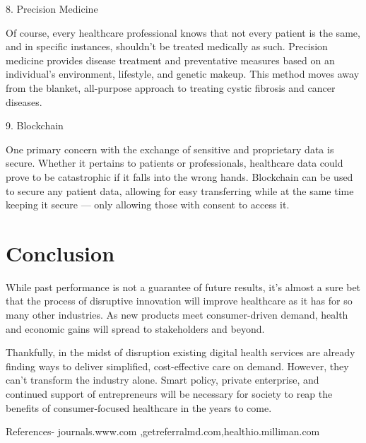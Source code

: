 \documentclass[11pt]{article}
\begin{document}
8. Precision Medicine

Of course, every healthcare professional knows that not every patient is the same, and in specific instances, shouldn’t be treated medically as such. Precision medicine provides disease treatment and preventative measures based on an individual’s environment, lifestyle, and genetic makeup. This method moves away from the blanket, all-purpose approach to treating cystic fibrosis and cancer diseases.

9. Blockchain

One primary concern with the exchange of sensitive and proprietary data is secure. Whether it pertains to patients or professionals, healthcare data could prove to be catastrophic if it falls into the wrong hands. Blockchain can be used to secure any patient data, allowing for easy transferring while at the same time keeping it secure — only allowing those with consent to access it.
\section{\huge Conclusion}
\raggedright While past performance is not a guarantee of future results, it’s almost a sure bet that the process of disruptive innovation will improve healthcare as it has for so many other industries. As new products meet consumer-driven demand, health and economic gains will spread to stakeholders and beyond.

Thankfully, in the midst of disruption existing digital health services are already finding ways to deliver simplified, cost-effective care on demand. However, they can’t transform the industry alone. Smart policy, private enterprise, and continued support of entrepreneurs will be necessary for society to reap the benefits of consumer-focused healthcare in the years to come.



 
\Large References-
journals.www.com ,getreferralmd.com,healthio.milliman.com
\end{document}
